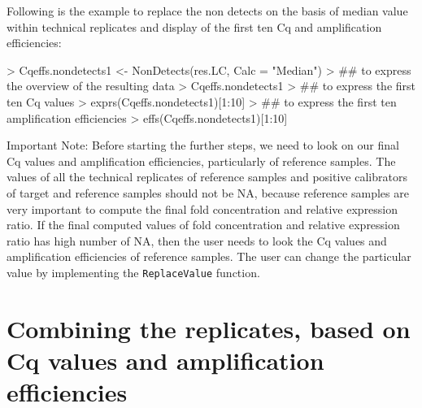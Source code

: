\documentclass[11pt]{article}
\newcommand{\code}[1]{{\tt #1}}
\begin{document}
Following is the example to replace the non detects on the basis of median value within technical replicates and display of the first ten Cq and amplification efficiencies:

\begin{Schunk}
\begin{Sinput}
> Cqeffs.nondetects1 <- NonDetects(res.LC, Calc = "Median")
> ## to express the overview of the resulting data
> Cqeffs.nondetects1 
> ## to express the first ten Cq values
> exprs(Cqeffs.nondetects1)[1:10]
> ## to express the first ten amplification efficiencies
> effs(Cqeffs.nondetects1)[1:10] 
\end{Sinput}
\end{Schunk}

Important Note: Before starting the further steps, we need to look on our final Cq values and amplification efficiencies, particularly of reference samples. The values of all the technical replicates of reference samples and positive calibrators of target and reference samples should not be NA, because reference samples are very important to compute the final fold concentration and relative expression ratio. If the final computed values of fold concentration and relative expression ratio has high number of NA, then the user needs to look the Cq values and amplification efficiencies of reference samples. The user can change the particular value by implementing the \code{ReplaceValue} function.
\section{Combining the replicates, based on Cq values and amplification efficiencies} 
\end{document}
